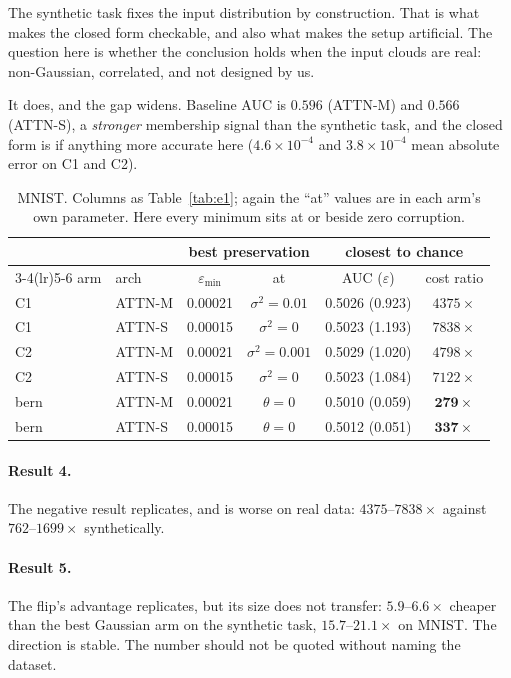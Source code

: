 \documentclass[11pt,a4paper]{article}
\newcommand{\vs}{\sigma^2}
\begin{document}
The synthetic task fixes the input distribution by construction. That is what
makes the closed form checkable, and also what makes the setup artificial. The
question here is whether the conclusion holds when the input clouds are real:
non-Gaussian, correlated, and not designed by us.

It does, and the gap widens. Baseline AUC is $0.596$ (ATTN-M) and $0.566$
(ATTN-S), a \emph{stronger} membership signal than the synthetic task, and the
closed form is if anything more accurate here ($4.6\times10^{-4}$ and
$3.8\times10^{-4}$ mean absolute error on C1 and C2).

\begin{table}[h]\centering\small
\begin{tabular}{llcccc}
\toprule
& & \multicolumn{2}{c}{best preservation} & \multicolumn{2}{c}{closest to chance}\\
\cmidrule(lr){3-4}\cmidrule(lr){5-6}
arm & arch & $\varepsilon_{\min}$ & at & AUC ($\varepsilon$) & cost ratio\\
\midrule
C1   & ATTN-M & 0.00021 & $\vs\!=\!0.01$  & 0.5026 (0.923) & $4375\times$\\
C1   & ATTN-S & 0.00015 & $\vs\!=\!0$     & 0.5023 (1.193) & $7838\times$\\
C2   & ATTN-M & 0.00021 & $\vs\!=\!0.001$ & 0.5029 (1.020) & $4798\times$\\
C2   & ATTN-S & 0.00015 & $\vs\!=\!0$     & 0.5023 (1.084) & $7122\times$\\
\addlinespace
bern & ATTN-M & 0.00021 & $\theta\!=\!0$  & 0.5010 (0.059) & $\mathbf{279\times}$\\
bern & ATTN-S & 0.00015 & $\theta\!=\!0$  & 0.5012 (0.051) & $\mathbf{337\times}$\\
\bottomrule
\end{tabular}
\caption{MNIST. Columns as Table~\ref{tab:e1}; again the ``at'' values are in
each arm's own parameter. Here every minimum sits at or beside zero
corruption.}
\label{tab:e2}
\end{table}

\paragraph{Result 4.} The negative result replicates, and is worse on real
data: $4375$--$7838\times$ against $762$--$1699\times$ synthetically.

\paragraph{Result 5.} The flip's advantage replicates, but its size does not
transfer: $5.9$--$6.6\times$ cheaper than the best Gaussian arm on the
synthetic task, $15.7$--$21.1\times$ on MNIST. The direction is stable. The
number should not be quoted without naming the dataset.
\end{document}
